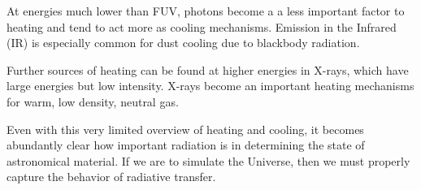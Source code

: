 At energies much lower than FUV, photons become a a less important factor to heating and tend to act more as cooling mechanisms. Emission in the Infrared (IR) is especially common for dust cooling due to blackbody radiation.

Further sources of heating can be found at higher energies in X-rays, which have large energies but low intensity. X-rays become an important heating mechanisms for warm, low density, neutral gas.


Even with this very limited overview of heating and cooling, it becomes abundantly clear how important radiation is in determining the state of astronomical material. If we are to simulate the Universe, then we must properly capture the behavior of radiative transfer.

%

